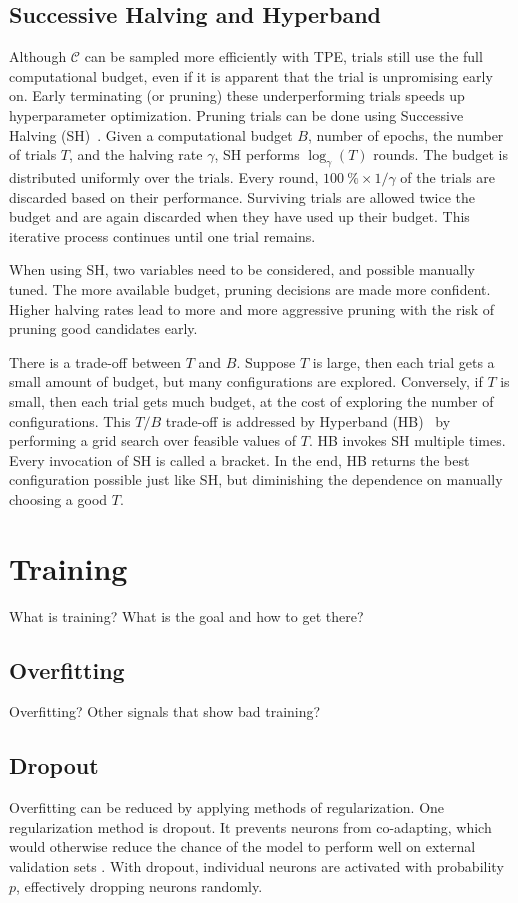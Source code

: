 \subsection{Successive Halving and Hyperband}
Although $\mathcal{C}$ can be sampled more efficiently with TPE, trials still use the full computational budget, even if it is apparent that the trial is unpromising early on.
Early terminating (or pruning) these underperforming trials speeds up hyperparameter optimization.
Pruning trials can be done using Successive Halving (SH)~\cite{Jamieson2016}.
Given a computational budget $B$, \eg number of epochs, the number of trials $T$, and the halving rate $\gamma$, SH performs $\log_\gamma(T)$ rounds.
The budget is distributed uniformly over the trials.
Every round, $\qty{100}{\percent} \times 1/\gamma$ of the trials are discarded based on their performance.
Surviving trials are allowed twice the budget and are again discarded when they have used up their budget.
This iterative process continues until one trial remains.

When using SH, two variables need to be considered, and possible manually tuned.
The more available budget, pruning decisions are made more confident.
Higher halving rates lead to more and more aggressive pruning with the risk of pruning good candidates early.

There is a trade-off between $T$ and $B$.
Suppose $T$ is large, then each trial gets a small amount of budget, but many configurations are explored.
Conversely, if $T$ is small, then each trial gets much budget, at the cost of exploring the number of configurations.
This $T/B$ trade-off is addressed by Hyperband (HB)~\cite{Li2016} by performing a grid search over feasible values of $T$.
HB invokes SH multiple times.
Every invocation of SH is called a bracket.
In the end, HB returns the best configuration possible just like SH, but diminishing the dependence on manually choosing a good $T$.

\section{Training}\label{Training}
What is training? What is the goal and how to get there?

\subsection{Overfitting}
Overfitting? Other signals that show bad training?

\subsection{Dropout}\label{sec:dropout}
Overfitting can be reduced by applying methods of regularization.
One regularization method is dropout.
It prevents neurons from co-adapting, which would otherwise reduce the chance of the model to perform well on external validation sets \cite{Srivastava2014}.
With dropout, individual neurons are activated with probability $p$, effectively dropping neurons randomly.

